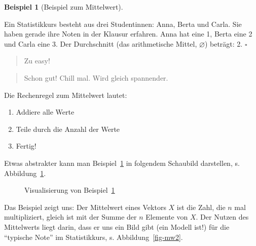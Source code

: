 \documentclass[
  letterpaper,
  twoside,
  open=any]{scrbook}
\providecommand{\tightlist}{%
  \setlength{\itemsep}{0pt}\setlength{\parskip}{0pt}}\usepackage{longtable,booktabs,array}
\theoremstyle{definition}
\theoremstyle{definition}
\newtheorem{example}{Beispiel}[chapter]
\theoremstyle{definition}
\theoremstyle{remark}
\begin{document}
\begin{example}[Beispiel zum
Mittelwert]\protect\hypertarget{exm-mw}{}\label{exm-mw}

Ein Statistikkurs besteht aus drei Studentinnen: Anna, Berta und Carla.
Sie haben gerade ihre Noten in der Klausur erfahren. Anna hat eine 1,
Berta eine 2 und Carla eine 3. Der Durchschnitt (das arithmetische
Mittel, \(\varnothing\)) beträgt: 2. \(\square\)

\end{example}

\begin{quote}
{} Zu easy!
\end{quote}

\begin{quote}
{} Schon gut! Chill mal. Wird gleich spannender.
\end{quote}

Die Rechenregel zum Mittelwert lautet:

\begin{enumerate}
\def\labelenumi{\arabic{enumi}.}
\tightlist
\item
  Addiere alle Werte
\item
  Teile durch die Anzahl der Werte
\item
  Fertig!
\end{enumerate}

Etwas abstrakter kann man Beispiel~\ref{exm-mw} in folgendem Schaubild
darstellen, s. Abbildung~\ref{fig-eq-mw}.

\begin{figure}


\caption{\label{fig-eq-mw}Visualisierung von Beispiel~\ref{exm-mw}}

\end{figure}%

Das Beispiel zeigt uns: Der Mittelwert eines Vektors \(X\) ist die Zahl,
die \(n\) mal multipliziert, gleich ist mit der Summe der \(n\) Elemente
von \(X\). Der Nutzen des Mittelwerts liegt darin, dass er uns ein Bild
gibt (ein Modell ist!) für die \enquote{typische Note} im Statistikkurs,
s. Abbildung~\ref{fig-mw2}.
\end{document}
